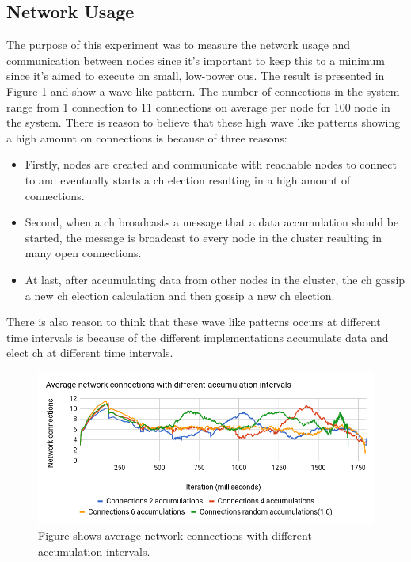 \documentclass[USenglish]{uit-thesis}
\begin{document}
\newpage

\subsection{Network Usage}
The purpose of this experiment was to measure the network usage and communication between nodes since it's important to keep this to a minimum since it's aimed to execute on small, low-power \gls{ou}s. The result is presented in Figure \ref{fig:netconnChart} and show a wave like pattern. The number of connections in the system range from 1 connection to 11 connections on average per node for 100 node in the system.
There is reason to believe that these high wave like patterns showing a high amount on connections is because of three reasons:

\begin{itemize}
\item Firstly, nodes are created and communicate with reachable nodes to connect to and eventually starts a \gls{ch} election resulting in a high amount of connections.
\item Second, when a \gls{ch} broadcasts a message that a data accumulation should be started, the message is broadcast to every node in the cluster resulting in many open connections.
\item At last, after accumulating data from other nodes in the cluster, the \gls{ch} gossip a new \gls{ch} election calculation and then gossip a new \gls{ch} election.
\end{itemize}

There is also reason to think that these wave like patterns occurs at different time intervals is because of the different implementations accumulate data and elect \gls{ch} at different time intervals.


\begin{figure} [ht]
\centering
\includegraphics[width=\textwidth]{netconnChart.png}
\caption{Figure shows average network connections with different accumulation intervals.}
\label{fig:netconnChart}
\end{figure}
\end{document}

